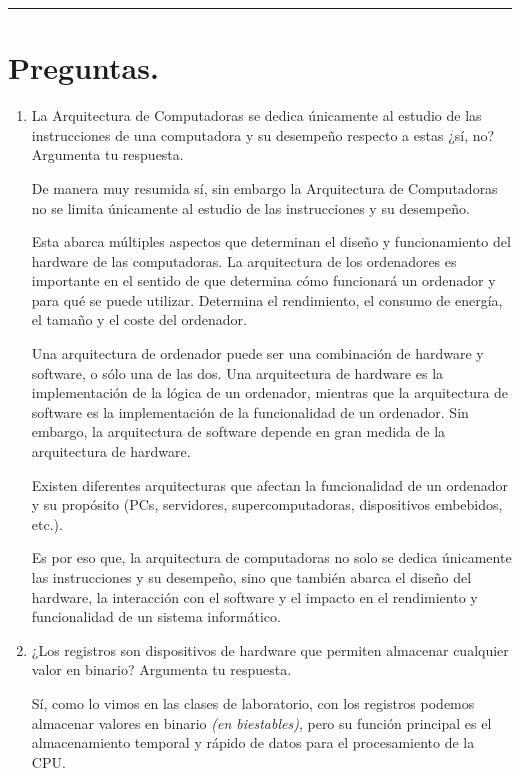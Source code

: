 \documentclass[12pt,letterpaper]{article}
\begin{document}
\bigskip
\hrule height 0.1pt
\bigskip

\section*{Preguntas.}

\begin{enumerate}
\item La Arquitectura de Computadoras se dedica únicamente al estudio de las instrucciones de una computadora y su desempeño respecto a estas ¿sí, no? Argumenta tu respuesta.
  \bigskip
  
  De manera muy resumida sí, sin embargo la Arquitectura de Computadoras no se limita únicamente al estudio de las instrucciones y su desempeño.
  
  Esta abarca múltiples aspectos que determinan el diseño y funcionamiento del hardware de las computadoras. La arquitectura de los ordenadores es importante en el sentido de que determina cómo funcionará un ordenador y para qué se puede utilizar. Determina el rendimiento, el consumo de energía, el tamaño y el coste del ordenador.
  
  Una arquitectura de ordenador puede ser una combinación de hardware y software, o sólo una de las dos. Una arquitectura de hardware es la implementación de la lógica de un ordenador, mientras que la arquitectura de software es la implementación de la funcionalidad de un ordenador. Sin embargo, la arquitectura de software depende en gran medida de la arquitectura de hardware.
  
  Existen diferentes arquitecturas que afectan la funcionalidad de un ordenador y su propósito (PCs, servidores, supercomputadoras, dispositivos embebidos, etc.).
  
  Es por eso que, la arquitectura de computadoras no solo se dedica únicamente las instrucciones y su desempeño, sino que también abarca el diseño del hardware, la interacción con el software y el impacto en el rendimiento y funcionalidad de un sistema informático.
  \bigskip
  
\item ¿Los registros son dispositivos de hardware que permiten almacenar cualquier valor en binario? Argumenta tu respuesta.
  \bigskip

  Sí, como lo vimos en las clases de laboratorio, con los registros podemos almacenar valores en binario \textit{(en biestables)}, pero su función principal es el almacenamiento temporal y rápido de datos para el procesamiento de la CPU.


\end{enumerate}
\end{document}
